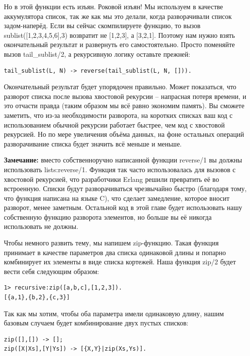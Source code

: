 \documentclass[a4paper,12pt]{report}
\newcommand{\ops}{\colorbox{lgreen}}
\begin{document}
Но в этой функции есть изъян. Роковой изъян! Мы используем в качестве аккумулятора список, так же как мы это делали, когда разворачивали список задом\--наперёд. Если вы сейчас скомпилируете функцию, то вызов \ops{sublist([1,2,3,4,5,6],3)} возвратит не [1,2,3], а [3,2,1]. Поэтому нам нужно взять окончательный результат и развернуть его самостоятельно. Просто поменяйте вызов \ops{tail\_sublist/2}, а рекурсивную логику оставьте прежней:
\begin{lstlisting}[style=erlang]
tail_sublist(L, N) -> reverse(tail_sublist(L, N, [])).
\end{lstlisting}

Окончательный результат будет упорядочен правильно. Может показаться, что разворот списка после вызова хвостовой рекурсии \--- напрасная потеря времени, и это отчасти правда (таким образом мы всё равно экономим память). Вы сможете заметить, что из\--за необходимости разворота, на коротких списках ваш код с использованием обычной рекурсии работает быстрее, чем код с хвостовой рекурсией. Но по мере увеличения объёма данных, на фоне остальных операций разворачивание списка будет значить всё меньше и меньше.\\
\colorbox{lgray}
{
    \begin{minipage}{\linewidth}
\textbf{Замечание:} вместо собственноручно написанной функции \ops{reverse/1} вы должны использовать \ops{lists:reverse/1}. Функция так часто использовалась для вызовов с хвостовой рекурсией, что разработчики Erlang решили превратить её во встроенную. Списки будут разворачиваться чрезвычайно быстро (благодаря тому, что функция написана на языке C), что сделает замедление, которое вносит разворот, менее заметным. Остальной код в этой главе будет использовать нашу собственную функцию разворота элементов, но больше вы её никогда использовать не должны.
    \end{minipage}
}

Чтобы немного развить тему, мы напишем zip\--функцию. Такая функция принимает в качестве параметров два списка одинаковой длины и попарно комбинирует их элементы в виде списка кортежей. Наша функция \ops{zip/2} будет вести себя следующим образом:
\begin{lstlisting}[style=erlang]
1> recursive:zip([a,b,c],[1,2,3]).
[{a,1},{b,2},{c,3}]
\end{lstlisting}

Так как мы хотим, чтобы оба параметра имели одинаковую длину, нашим базовым случаем будет комбинирование двух пустых списков:
\begin{lstlisting}[style=erlang]
zip([],[]) -> [];
zip([X|Xs],[Y|Ys]) -> [{X,Y}|zip(Xs,Ys)].
\end{lstlisting}
\end{document}
